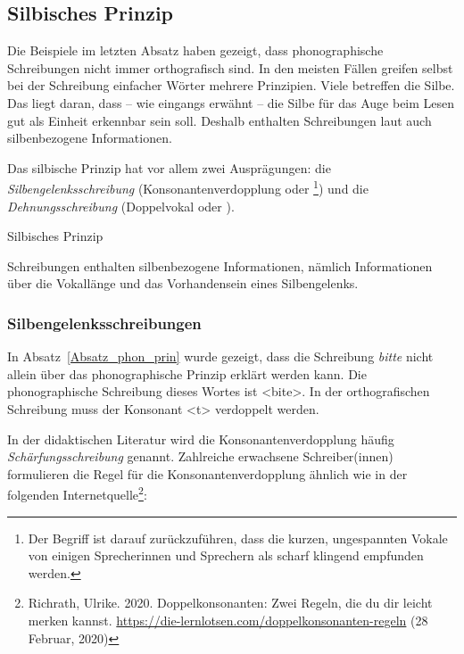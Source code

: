 \subsection{Silbisches Prinzip}\label{sec:silbischesPrinzip}

Die Beispiele im letzten Absatz haben gezeigt, dass phonographische Schreibungen nicht immer orthografisch sind. In den meisten Fällen greifen selbst bei der Schreibung einfacher Wörter mehrere Prinzipien. Viele betreffen die Silbe. Das liegt daran, dass -- wie eingangs erwähnt -- die Silbe für das Auge beim Lesen gut als Einheit erkennbar sein soll. Deshalb enthalten Schreibungen laut \citet[911ff]{Duden2022} auch silbenbezogene Informationen. 


Das silbische Prinzip hat vor allem zwei Ausprägungen: die \textit{Silbengelenksschreibung} (Konsonantenverdopplung oder \footnote{Der Begriff ist darauf zurückzuführen, dass die kurzen, ungespannten Vokale von einigen Sprecherinnen und Sprechern als scharf klingend empfunden werden.}) und die \textit{Dehnungsschreibung} (Doppelvokal oder ).


\begin{Definition}{Silbisches Prinzip}

\noindent Schreibungen enthalten silbenbezogene Informationen, nämlich Informationen über die Vokallänge und das Vorhandensein eines Silbengelenks.


\end{Definition}



\subsubsection{Silbengelenksschreibungen}\label{sec:Silbengelenksschreibungen}


In Absatz~\ref{Absatz_phon_prin} wurde gezeigt, dass die Schreibung \textit{bitte} nicht allein über das phonographische Prinzip erklärt werden kann. Die phonographische Schreibung dieses Wortes ist <bite>. In der orthografischen Schreibung muss der Konsonant <t> verdoppelt werden.

In der didaktischen Literatur wird die Konsonantenverdopplung häufig \textit{Schärfungsschreibung} genannt. Zahlreiche erwachsene Schreiber(innen) formulieren die Regel für die Konsonantenverdopplung ähnlich wie in der folgenden Internetquelle\footnote{Richrath, Ulrike. 2020. Doppelkonsonanten: Zwei Regeln, die du dir leicht merken kannst. \url{https://die-lernlotsen.com/doppelkonsonanten-regeln} (28 Februar,
2020)}:

